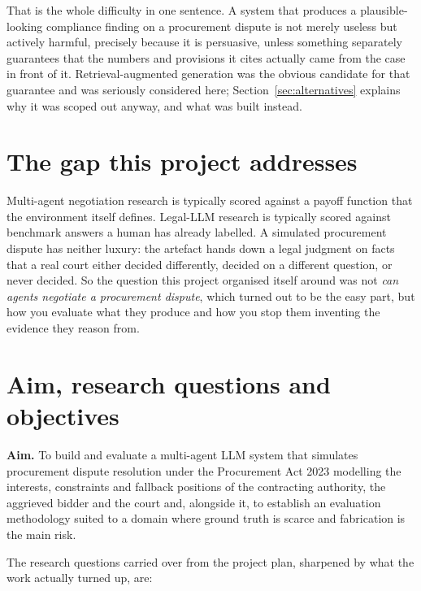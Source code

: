 That is the whole difficulty in one sentence. A system that produces a
plausible-looking compliance finding on a procurement dispute is not merely
useless but actively harmful, precisely because it is persuasive, unless
something separately guarantees that the numbers and provisions it cites
actually came from the case in front of it. Retrieval-augmented generation \cite{lewis2020rag} was the
obvious candidate for that guarantee and was seriously considered here;
Section~\ref{sec:alternatives} explains why it was scoped out anyway, and what
was built instead.

\section{The gap this project addresses}
\label{sec:gap}

Multi-agent negotiation research is typically scored against a payoff function
that the environment itself defines. Legal-LLM research is typically scored
against benchmark answers a human has already labelled. A simulated procurement
dispute has neither luxury: the artefact hands down a legal judgment on facts
that a real court either decided differently, decided on a different question, or
never decided. So the question this project organised itself around was not
\emph{can agents negotiate a procurement dispute}, which turned out to be the easy
part, but how you evaluate what they produce and how you stop them inventing the
evidence they reason from.

\section{Aim, research questions and objectives}
\label{sec:objectives}

\textbf{Aim.} To build and evaluate a multi-agent LLM system that simulates
procurement dispute resolution under the Procurement Act 2023 modelling the
interests, constraints and fallback positions of the contracting authority, the
aggrieved bidder and the court and, alongside it, to establish an evaluation
methodology suited to a domain where ground truth is scarce and fabrication is
the main risk.

The research questions carried over from the project plan, sharpened by
what the work actually turned up, are:

